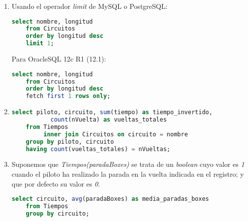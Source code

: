 \begin{enumerate}
	\item 
	Usando el operador \textit{limit} de MySQL o PostgreSQL:
	\begin{lstlisting}[language=sql]
	select nombre, longitud
	from Circuitos
	order by longitud desc
	limit 1;\end{lstlisting}
	
	Para OracleSQL 12c R1 (12.1):
	\begin{lstlisting}[language=sql]
	select nombre, longitud
	from Circuitos
	order by longitud desc
	fetch first 1 rows only;\end{lstlisting}
	
	\item
	\begin{lstlisting}[language=sql]
	select piloto, circuito, sum(tiempo) as tiempo_invertido, 
		   count(nVuelta) as vueltas_totales
	from Tiempos
		 inner join Circuitos on circuito = nombre
	group by piloto, circuito
	having count(vueltas_totales) = nVueltas;\end{lstlisting}
	
	\newpage
	
	\item
	Suponemos que \textit{Tiempos(paradaBoxes)} se trata de un \textit{boolean} cuyo valor
	es \textit{1} cuando el piloto ha realizado la parada en la vuelta indicada en el
	registro; y que por defecto su valor es \textit{0}.
	\begin{lstlisting}[language=sql]
	select circuito, avg(paradaBoxes) as media_paradas_boxes
	from Tiempos
	group by circuito;\end{lstlisting}
\end{enumerate}